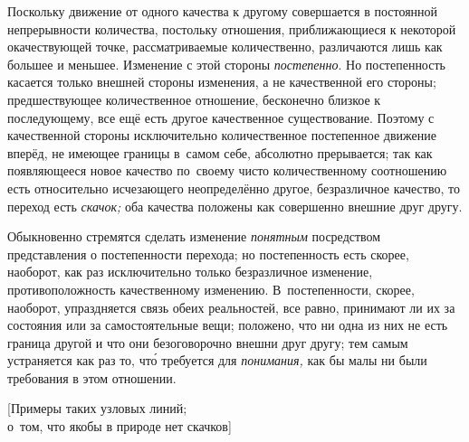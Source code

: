 Поскольку движение от одного качества к другому совершается в постоянной
непрерывности количества, постольку отношения, приближающиеся к некоторой
окачествующей точке, рассматриваемые количественно, различаются лишь как
большее и меньшее. Изменение с этой стороны {\em постепенно}. Но постепенность
касается только внешней стороны изменения, а не качественной его стороны;
предшествующее количественное отношение, бесконечно близкое к последующему,
все ещё есть другое качественное существование. Поэтому с качественной стороны
исключительно количественное постепенное движение вперёд, не имеющее границы
в~самом себе, абсолютно прерывается; так как появляющееся новое качество
по~своему чисто количественному соотношению есть относительно исчезающего
неопределённо другое, безразличное качество, то переход есть {\em скачок;}
оба качества положены как совершенно внешние друг другу.

Обыкновенно стремятся сделать изменение {\em понятным} посредством
представления о постепенности перехода; но постепенность есть скорее, наоборот,
как раз исключительно только безразличное изменение, противоположность
качественному изменению. В~постепенности, скорее, наоборот, упраздняется связь
обеих реальностей, все равно, принимают ли их за состояния или за
самостоятельные вещи; положено, что ни одна из них не есть граница другой и что
они безоговорочно внешни друг другу; тем самым устраняется как раз то, чт\'{о}
требуется для {\em понимания,} как бы малы ни были требования в этом отношении.

%
{[Примеры таких узловых линий;\\о~том, что якобы в природе нет скачков]}

